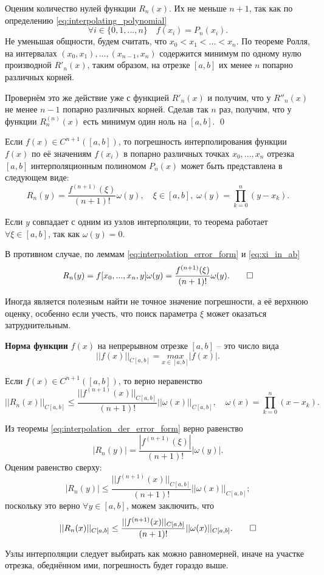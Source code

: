 \documentclass[../main.tex]{subfile}
\begin{document}
	Оценим количество нулей функции $R_n(x)$. Их не меньше $n+1$, так как
	по определению \eqref{eq:interpolating_polynomial}
	\[\forall i\in \{0,1,...,n\}\quad f(x_i)=P_n(x_i).\]
	Не уменьшая общности, будем считать, что $x_0<x_1<...<x_n$.
	По теореме Ролля, на интервалах $(x_0,x_1),...,(x_{n-1},x_n)$ содержится
	минимум по одному нулю производной $R'_n(x)$, таким образом, на отрезке
	$[a,b]$ их менее $n$ попарно различных корней.

	Провернём это же действие уже с функцией $R'_n(x)$ и получим, что у
	$R''_n(x)$ не менее $n-1$ попарно различных корней. Сделав так $n$ раз,
	получим, что у функции $R_n^{(n)}(x)$ есть минимум один ноль на $[a,b]$.
	\qed

\begin{theorem}\label{eq:interpolation_der_error_form}
	Если $f(x)\in C^{n+1}([a,b])$, то погрешность интерполирования функции
	$f(x)$ по её значениям $f(x_i)$ в попарно различных точках $x_0,...,x_n$
	отрезка $[a,b]$ интерполяционным полиномом $P_n(x)$ может быть
	представлена в следующем виде:
	\[\boxed{R_n(y)=\frac{f^{(n+1)}(\xi)}{(n+1)!}\omega(y)},\quad\xi\in
	[a,b],\;\omega(y)=\prod_{k=0}^{n}(y-x_k).\]
\end{theorem}

\beginproof

	Если $y$ совпадает с одним из узлов интерполяции, то теорема работает
	$\forall\xi\in[a,b]$, так как $\omega(y)=0$.

	В противном случае, по леммам \eqref{eq:interpolation_error_form} и
	\eqref{eq:xi_in_ab}
	\[R_n(y)=f[x_0,...,x_n,y]\omega(y)=\frac{f^{(n+1)}(\xi)}{(n+1)!}
	\omega(y).\qed\]

Иногда является полезным найти не точное значение погрешности, а её верхнюю
оценку, особенно если учесть, что поиск параметра $\xi$ может оказаться
затруднительным.

\begin{define}\label{eq:function_norm}
	\textbf{Норма функции} $f(x)$ на непрерывном отрезке $[a,b]$ -- это
	число вида
	\[||f(x)||_{C[a,b]}=\underset{x\in[a,b]}{max}|f(x)|.\]
\end{define}

\begin{corollary}
	Если $f(x)\in C^{n+1}([a,b])$, то верно неравенство
	\[||R_n(x)||_{C[a,b]}\le \frac{||f^{(n+1)}(x)||_{C[a,b]}}{(n+1)!}
	||\omega(x)||_{C[a,b]},\quad \omega(x)=\prod_{k=0}^{n}(x-x_k).\]
\end{corollary}

\beginproof
	Из теоремы \eqref{eq:interpolation_der_error_form} верно равенство
	\[|R_n(y)|=\frac{|f^{(n+1)}(\xi)|}{(n+1)!}|\omega(y)|.\]
	Оценим равенство сверху:
	\[|R_n(y)|\le\frac{||f^{(n+1)}(x)||_{C[a,b]}}{(n+1)!}||\omega(x)||_
	{C[a,b]};\]
	поскольку это верно $\forall y\in[a,b]$, можем заключить, что
	\[||R_n(x)||_{C[a,b]}\le \frac{||f^{(n+1)}(x)||_{C[a,b]}}{(n+1)!}
	||\omega(x)||_{C[a,b]}.\qed\]

Узлы интерполяции следует выбирать как можно равномерней, иначе на участке
отрезка, обеднённом ими, погрешность будет гораздо выше.
\end{document}
